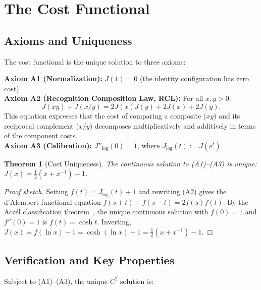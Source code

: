 \documentclass[12pt,a4paper]{article}
\newtheorem{theorem}{Theorem}[section]
\theoremstyle{definition}
\theoremstyle{remark}
\begin{document}
\section{The Cost Functional}
\label{sec:cost}

\subsection{Axioms and Uniqueness}

The cost functional is the unique solution to three axioms:

\noindent\textbf{Axiom A1 (Normalization):} $J(1) = 0$ (the identity
configuration has zero cost).\\
\textbf{Axiom A2 (Recognition Composition Law, RCL):} For all
$x, y > 0$:
\begin{equation}
\label{eq:RCL}
  J(xy) + J(x/y) = 2J(x)J(y) + 2J(x) + 2J(y).
\end{equation}
This equation expresses that the cost of comparing a composite ($xy$)
and its reciprocal complement ($x/y$) decomposes multiplicatively and
additively in terms of the component costs.\\
\textbf{Axiom A3 (Calibration):} $J''_{\log}(0) = 1$, where
$J_{\log}(t) := J(e^t)$.

\begin{theorem}[Cost Uniqueness]
\label{thm:cost-unique}
The continuous solution to \textup{(A1)--(A3)} is unique:
$J(x) = \tfrac{1}{2}(x + x^{-1}) - 1$.
\end{theorem}

\begin{proof}[Proof sketch]
Setting $f(t) = J_{\log}(t) + 1$ and rewriting \textup{(A2)} gives
the d'Alembert functional equation $f(s+t) + f(s-t) = 2f(s)f(t)$.
By the Acz\'el classification theorem~\cite{Aczel1966}, the unique
continuous solution with $f(0) = 1$ and $f''(0) = 1$ is
$f(t) = \cosh t$.  Inverting, $J(x) = f(\ln x) - 1 = \cosh(\ln x) - 1
= \tfrac{1}{2}(x + x^{-1}) - 1$.
\end{proof}

\subsection{Verification and Key Properties}

Subject to (A1)--(A3), the unique $C^2$ solution is:
\end{document}
